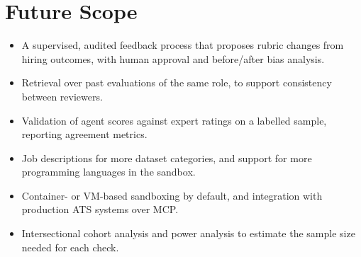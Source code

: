 \section{Future Scope}
\begin{itemize}
\item A supervised, audited feedback process that proposes rubric changes from hiring outcomes, with human approval and before/after bias analysis.
\item Retrieval over past evaluations of the same role, to support consistency between reviewers.
\item Validation of agent scores against expert ratings on a labelled sample, reporting agreement metrics.
\item Job descriptions for more dataset categories, and support for more programming languages in the sandbox.
\item Container- or VM-based sandboxing by default, and integration with production ATS systems over MCP.
\item Intersectional cohort analysis and power analysis to estimate the sample size needed for each check.
\end{itemize}
